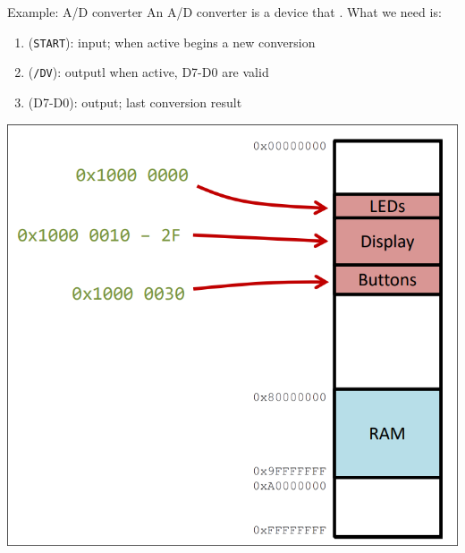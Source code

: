 \begin{parag}{Example: A/D converter}
    An A/D converter is a device that . What we need is:
	\begin{enumerate}
	    \item {} (\texttt{START}): input; when active begins a new conversion
	    \item {} (\texttt{/DV}): outputl when active, D7-D0 are valid
	    \item {} (D7-D0): output; last conversion result
	\end{enumerate}
	\begin{center}
	\includegraphics[scale=0.2]{screenshots/2025-10-22_5.png}
	\end{center}
	
\end{parag}


